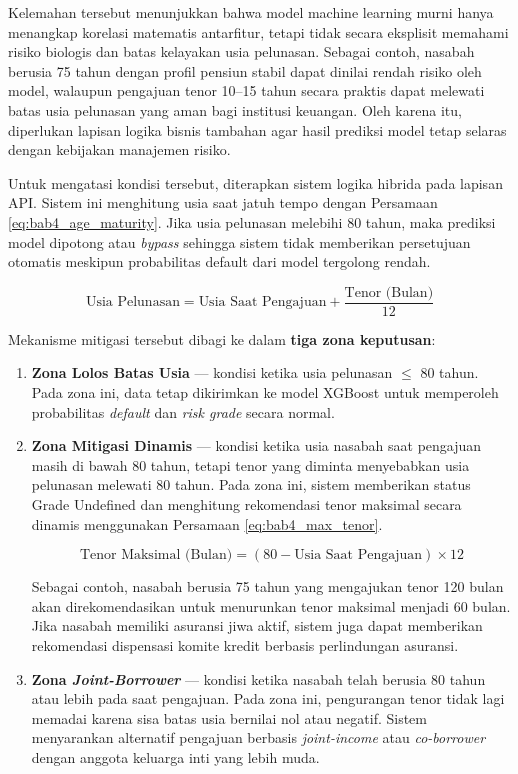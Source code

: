 Kelemahan tersebut menunjukkan bahwa model machine learning murni hanya menangkap korelasi matematis antarfitur, tetapi tidak secara eksplisit memahami risiko biologis dan batas kelayakan usia pelunasan. Sebagai contoh, nasabah berusia 75 tahun dengan profil pensiun stabil dapat dinilai rendah risiko oleh model, walaupun pengajuan tenor 10--15 tahun secara praktis dapat melewati batas usia pelunasan yang aman bagi institusi keuangan. Oleh karena itu, diperlukan lapisan logika bisnis tambahan agar hasil prediksi model tetap selaras dengan kebijakan manajemen risiko.

Untuk mengatasi kondisi tersebut, diterapkan sistem logika hibrida pada lapisan API. Sistem ini menghitung usia saat jatuh tempo dengan Persamaan \ref{eq:bab4_age_maturity}. Jika usia pelunasan melebihi 80 tahun, maka prediksi model dipotong atau \textit{bypass} sehingga sistem tidak memberikan persetujuan otomatis meskipun probabilitas default dari model tergolong rendah.

\begin{equation}
    \text{Usia Pelunasan} = \text{Usia Saat Pengajuan} + \frac{\text{Tenor (Bulan)}}{12}
    \label{eq:bab4_age_maturity}
\end{equation}

Mekanisme mitigasi tersebut dibagi ke dalam \textbf{tiga zona keputusan}:

\begin{enumerate}
    \item \textbf{Zona Lolos Batas Usia} --- kondisi ketika usia pelunasan $\leq$ 80 tahun. Pada zona ini, data tetap dikirimkan ke model XGBoost untuk memperoleh probabilitas \textit{default} dan \textit{risk grade} secara normal.

    \item \textbf{Zona Mitigasi Dinamis} --- kondisi ketika usia nasabah saat pengajuan masih di bawah 80 tahun, tetapi tenor yang diminta menyebabkan usia pelunasan melewati 80 tahun. Pada zona ini, sistem memberikan status Grade Undefined dan menghitung rekomendasi tenor maksimal secara dinamis menggunakan Persamaan \ref{eq:bab4_max_tenor}.

    \begin{equation}
        \text{Tenor Maksimal (Bulan)} = (80 - \text{Usia Saat Pengajuan}) \times 12
        \label{eq:bab4_max_tenor}
    \end{equation}

    Sebagai contoh, nasabah berusia 75 tahun yang mengajukan tenor 120 bulan akan direkomendasikan untuk menurunkan tenor maksimal menjadi 60 bulan. Jika nasabah memiliki asuransi jiwa aktif, sistem juga dapat memberikan rekomendasi dispensasi komite kredit berbasis perlindungan asuransi.

    \item \textbf{Zona \textit{Joint-Borrower}} --- kondisi ketika nasabah telah berusia 80 tahun atau lebih pada saat pengajuan. Pada zona ini, pengurangan tenor tidak lagi memadai karena sisa batas usia bernilai nol atau negatif. Sistem menyarankan alternatif pengajuan berbasis \textit{joint-income} atau \textit{co-borrower} dengan anggota keluarga inti yang lebih muda.
\end{enumerate}

